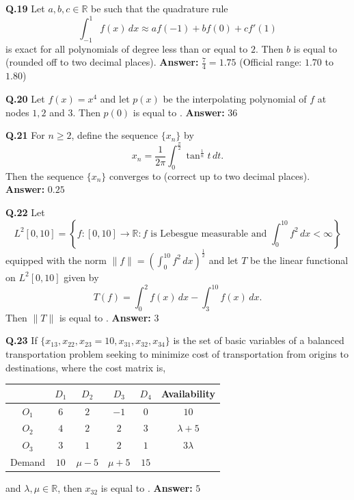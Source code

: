 \documentclass[11pt,a4paper]{article}
\newcommand{\ans}[1]{\textbf{Answer:} #1\par\medskip}
\begin{document}
\textbf{Q.19} Let $a, b, c \in \mathbb{R}$ be such that the quadrature rule
\[
  \int_{-1}^{1} f(x)\,dx \approx a f(-1) + b f(0) + c f'(1)
\]
is exact for all polynomials of degree less than or equal to $2$. Then $b$ is equal to \underline{\hspace{2cm}} (rounded off to two decimal places).
\ans{$\frac{7}{4} = 1.75$ (Official range: $1.70$ to $1.80$)}

\textbf{Q.20} Let $f(x) = x^4$ and let $p(x)$ be the interpolating polynomial of $f$ at nodes $1, 2$ and $3$. Then $p(0)$ is equal to \underline{\hspace{2cm}}.
\ans{$36$}

\textbf{Q.21} For $n \ge 2$, define the sequence $\{x_n\}$ by
\[
  x_n = \frac{1}{2\pi} \int_0^{\frac{\pi}{2}} \tan^{\frac{1}{n}} t\,dt.
\]
Then the sequence $\{x_n\}$ converges to \underline{\hspace{2cm}} (correct up to two decimal places).
\ans{$0.25$}

\textbf{Q.22} Let
\[
  L^2[0, 10] = \left\{f : [0, 10] \to \mathbb{R} : f \text{ is Lebesgue measurable and } \int_0^{10} f^2\,dx < \infty\right\}
\]
equipped with the norm $\|f\| = \left(\int_0^{10} f^2\,dx\right)^{\frac{1}{2}}$ and let $T$ be the linear functional on $L^2[0, 10]$ given by
\[
  T(f) = \int_0^2 f(x)\,dx - \int_3^{10} f(x)\,dx.
\]
Then $\|T\|$ is equal to \underline{\hspace{2cm}}.
\ans{$3$}

\textbf{Q.23} If $\{x_{13}, x_{22}, x_{23} = 10, x_{31}, x_{32}, x_{34}\}$ is the set of basic variables of a balanced transportation problem seeking to minimize cost of transportation from origins to destinations, where the cost matrix is,
\begin{center}
\begin{tabular}{|c|c|c|c|c|c|}
\hline
 & $D_1$ & $D_2$ & $D_3$ & $D_4$ & Availability \\
\hline
$O_1$ & $6$ & $2$ & $-1$ & $0$ & $10$ \\
\hline
$O_2$ & $4$ & $2$ & $2$ & $3$ & $\lambda + 5$ \\
\hline
$O_3$ & $3$ & $1$ & $2$ & $1$ & $3\lambda$ \\
\hline
Demand & $10$ & $\mu - 5$ & $\mu + 5$ & $15$ & \\
\hline
\end{tabular}
\end{center}
and $\lambda, \mu \in \mathbb{R}$, then $x_{32}$ is equal to \underline{\hspace{2cm}}.
\ans{$5$}
\end{document}
